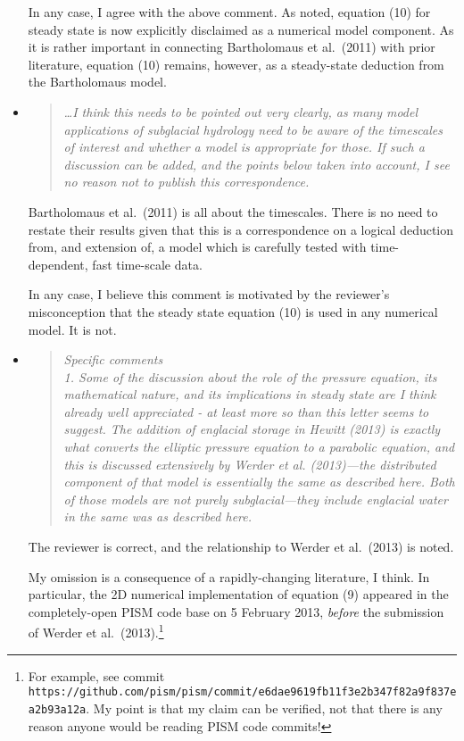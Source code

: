 \documentclass[11pt,reqno]{amsart}
\newcommand{\reply}[2]{
\medskip\medskip
\item  \begin{quote}
\emph{#1}
\end{quote}

\medskip
\noindent #2}
\begin{document}
\begin{itemize}
{In any case, I agree with the above comment.  As noted, equation (10) for steady state is now explicitly disclaimed as a numerical model component.  As it is rather important in connecting Bartholomaus et al.~(2011) with prior literature, equation (10) remains, however, as a steady-state deduction from the Bartholomaus model.}

\reply{\dots I think this needs to be pointed out very clearly, as many model applications of subglacial hydrology need to be aware of the timescales of interest and whether a model is appropriate for those. If such a discussion can be added, and the points below taken into account, I see no reason not to publish this correspondence.}
{Bartholomaus et al.~(2011) is all about the timescales.  There is no need to restate their results given that this is a correspondence on a logical deduction from, and extension of, a model which is carefully tested with time-dependent, fast time-scale data.

In any case, I believe this comment is motivated by the reviewer's misconception that the steady state equation (10) is used in any numerical model.  It is not.}

\reply{Specific comments \smallskip \\
1. Some of the discussion about the role of the pressure equation, its mathematical nature, and its implications in steady state are I think already well appreciated - at least more so than this letter seems to suggest. The addition of englacial storage in Hewitt (2013) is exactly what converts the elliptic pressure equation to a parabolic equation, and this is discussed extensively by Werder et al. (2013)---the distributed component of that model is essentially the same as described here.  Both of those models are not purely subglacial---they include englacial water in the same was as described here.}
{The reviewer is correct, and the relationship to Werder et al.~(2013) is noted.

My omission is a consequence of a rapidly-changing literature, I think.  In particular, the 2D numerical implementation of equation (9) appeared in the completely-open PISM code base on 5 February 2013, \emph{before} the submission of Werder et al.~(2013).\footnote{For example, see commit \texttt{https://github.com/pism/pism/commit/e6dae9619fb11f3e2b347f82a9f837ea2b93a12a}.  My point is that my claim can be verified, not that there is any reason anyone would be reading PISM code commits!}

}
\end{itemize}
\end{document}
